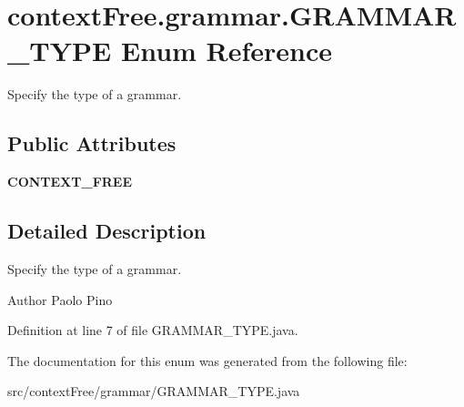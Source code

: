 \hypertarget{enumcontext_free_1_1grammar_1_1_g_r_a_m_m_a_r___t_y_p_e}{\section{context\-Free.\-grammar.\-G\-R\-A\-M\-M\-A\-R\-\_\-\-T\-Y\-P\-E Enum Reference}
\label{enumcontext_free_1_1grammar_1_1_g_r_a_m_m_a_r___t_y_p_e}
}


Specify the type of a grammar.  


\subsection*{Public Attributes}
\begin{DoxyCompactItemize}
\item 
\hypertarget{enumcontext_free_1_1grammar_1_1_g_r_a_m_m_a_r___t_y_p_e_a1716ccff248a4c662919f646073266e2}{{\bfseries C\-O\-N\-T\-E\-X\-T\-\_\-\-F\-R\-E\-E}}\label{enumcontext_free_1_1grammar_1_1_g_r_a_m_m_a_r___t_y_p_e_a1716ccff248a4c662919f646073266e2}

\end{DoxyCompactItemize}


\subsection{Detailed Description}
Specify the type of a grammar. 

\begin{DoxyAuthor}{Author}
Paolo Pino 
\end{DoxyAuthor}


Definition at line 7 of file G\-R\-A\-M\-M\-A\-R\-\_\-\-T\-Y\-P\-E.\-java.



The documentation for this enum was generated from the following file\-:\begin{DoxyCompactItemize}
\item 
src/context\-Free/grammar/G\-R\-A\-M\-M\-A\-R\-\_\-\-T\-Y\-P\-E.\-java\end{DoxyCompactItemize}

